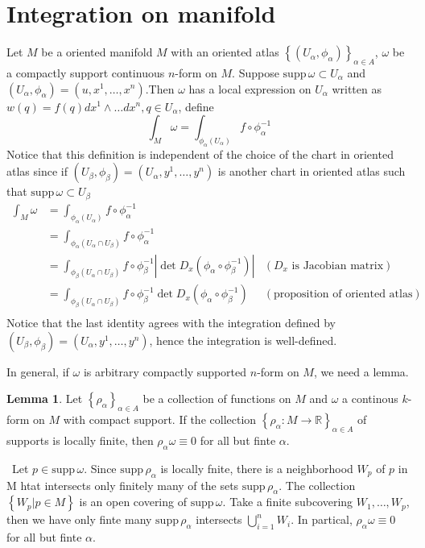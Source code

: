 \documentclass[12pt,a4paper]{book}
\newenvironment{prooff}{{\noindent\it\textcolor{cyan!40!black}{Proof}:}\,}{\par}
\newcommand{\bbrace}[1]{\left\{ #1 \right\} }
\newcommand{\bb}[1]{\mathbb{#1}}
\theoremstyle{definition}
\newtheorem{lem}[defn]{Lemma}
\begin{document}
\section{Integration on manifold}
Let $M$ be a oriented manifold $M$ with an oriented atlas $\bbrace{(U_{\alpha},\phi_{\alpha})}_{\alpha\in A}$, $\omega$ be a compactly support continuous $n$-form on $M$.
Suppose $\text{supp}\,\omega\subset U_{\alpha}$ and $(U_{\alpha},\phi_{\alpha})=(u,x^1,\dots,x^n)$.Then $\omega$ has a local expression on $U_{\alpha}$ written as $w(q)=f(q)dx^1\wedge \dots dx^n, q\in U_{\alpha}$, define
\begin{equation}
    \int_{M}\omega=\int_{\phi_{\alpha}(U_{\alpha})}f\circ\phi_{\alpha}^{-1}
\end{equation}
Notice that this definition is independent of the choice of the chart in oriented atlas since if $(U_{\beta},\phi_{\beta})=(U_{\alpha},y^1,\dots,y^n)$ is another chart in oriented atlas such that
$\text{supp}\,\omega\subset U_{\beta}$
\begin{align*}
    \int_{M}\omega & =\int_{\phi_{\alpha}(U_{\alpha})}f\circ\phi_{\alpha}^{-1}                                                             &                                        \\
                   & =\int_{\phi_{\alpha}(U_{\alpha}\cap U_{\beta})}f\circ\phi_{\alpha}^{-1}                                               &                                        \\
                   & =\int_{\phi_{\beta} (U_{\alpha}\cap U_{\beta})}f\circ\phi_{\beta}^{-1}|\det D_x(\phi_{\alpha}\circ\phi_{\beta}^{-1})| & (\text{$D_x$ is Jacobian matrix})      \\
                   & =\int_{\phi_{\beta} (U_{\alpha}\cap U_{\beta})}f\circ\phi_{\beta}^{-1} \det D_x(\phi_{\alpha}\circ\phi_{\beta}^{-1})  & (\text{proposition of oriented atlas}) \\
\end{align*}
Notice that the last identity agrees with the integration defined by $(U_{\beta},\phi_{\beta})=(U_{\alpha},y^1,\dots,y^n)$, hence the integration is well-defined.

In general, if $\omega$ is arbitrary compactly supported $n$-form on $M$, we need a lemma.
\begin{lem}
    Let $\bbrace{\rho_{\alpha}}_{\alpha\in A}$ be a collection of functions on $M$ and $\omega$ a continous $k$-form on $M$ with compact support. If the collection $\bbrace{\rho_{\alpha}:M\rightarrow\bb{R}}_{\alpha\in A}$
    of supports is locally finite, then $\rho_{\alpha}\omega\equiv 0$ for all but finte $\alpha$.
\end{lem}
\begin{prooff}
    Let $p\in \text{supp}\,\omega$. Since $\text{supp}\,\rho_{\alpha}$ is locally fnite, there is a neighborhood $W_p$ of $p$ in M htat intersects only finitely many of the sets $\text{supp}\,\rho_{\alpha}$. The collection
    $\bbrace{W_p|p\in M}$ is an open covering of $\text{supp}\,\omega$. Take a finite subcovering $W_1,\dots,W_p$, then we have only finte many $\text{supp}\,\rho_{\alpha}$ intersects $\bigcup_{i=1}^n W_i$. In partical, $\rho_{\alpha}\omega\equiv 0$ for all but finte $\alpha$.
\end{prooff}
\end{document}
